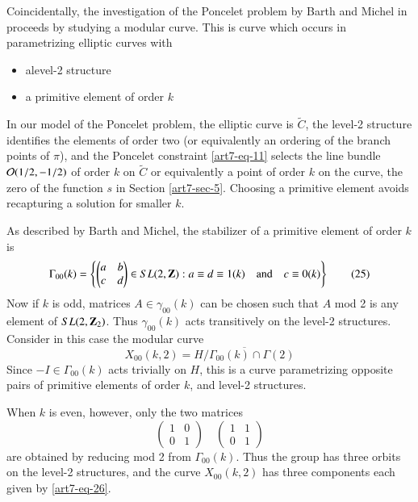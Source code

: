 Coincidentally, the investigation of the Poncelet problem by Barth and Michel in \cite{art7-key1} proceeds by studying a modular curve. This is curve which occurs in parametrizing elliptic curves with     
\begin{itemize}
\item a\pageoriginale level-2 structure

\item a primitive element of order $k$
\end{itemize}
In our model of the Poncelet problem, the elliptic curve is $\tilde{C}$, the level-2
structure identifies the elements of order two (or equivalently an ordering of the branch points of $\pi$), and the Poncelet constraint \eqref{art7-eq-11} selects the line bundle $\mathcal{O}(1/2,-1/2)$ of order $k$ on $\tilde{C}$ or equivalently a point of order $k$ on the curve, the zero of the function $s$ in Section \ref{art7-sec-5}. Choosing a primitive element avoids recapturing a solution for smaller $k$.

As described by Barth and Michel, the stabilizer of a primitive element of order $k$ is
\begin{equation*}\label{art7-eq-25}
\Gamma_{00}(k) = \left\{\begin{pmatrix}
a & b\\
c & d
\end{pmatrix}
\in SL(2, \mathbf{Z}) : a \equiv d \equiv 1(k)\quad  \text{and}\quad c\equiv 0(k)\right\}\tag{25}
\end{equation*}
Now if $k$ is odd, matrices $A\in \gamma_{00}(k)$ can be chosen such that $A$ mod 2 is any element of $SL(2,\mathbf{Z}_{2})$. Thus $\gamma_{00}(k)$ acts transitively on the level-2 structures. Consider in this case the modular curve
\begin{equation*}\label{art7-eq-26}
X_{00}(k,2) = \overline{H/\Gamma_{00}(k)\cap \Gamma(2)}\tag{26}
\end{equation*}
Since $-I \in \Gamma_{00}(k)$ acts trivially on $H$, this is a curve parametrizing opposite pairs of primitive elements of order $k$, and level-2 structures.

When $k$ is even, however, only the two matrices
$$
\begin{pmatrix}
 1 & 0\\
 0 & 1
\end{pmatrix}
\quad 
\begin{pmatrix}
 1 & 1\\
 0 & 1
\end{pmatrix}
$$
are obtained by reducing mod 2 from $\Gamma_{00}(k)$. Thus the group has three orbits on the level-2 structures, and the curve $X_{00}(k,2)$ has three components each given by \eqref{art7-eq-26}.

